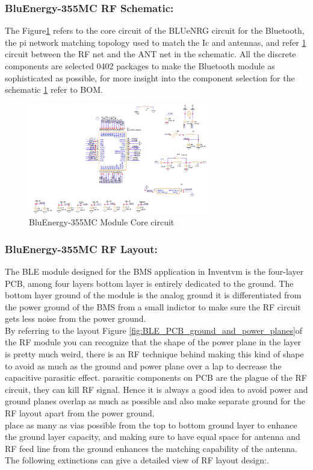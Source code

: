 \subsubsection{BluEnergy-355MC RF Schematic:}
The Figure\ref{fig:STM_BLE_Schematic} refers to the core circuit of the BLUeNRG circuit for the Bluetooth, the pi network matching topology used to match the Ic and antennas, and refer \ref{fig:STM_BLE_Schematic} circuit between the RF net and the ANT net in the schematic.
All the discrete components are selected 0402 packages to make the Bluetooth module as sophisticated as possible, for more insight into the component selection for the schematic \ref{fig:STM_BLE_Schematic} refer to BOM\cite{BLNRG355_STEVAL_BOM}.
\begin{figure}[h]
	\centering
	\includegraphics[width=0.7\textwidth]{Chap03/Figures/STM_BLE_Schematic.PNG}
	\caption{BluEnergy-355MC Module Core circuit }
	\label{fig:STM_BLE_Schematic}
\end{figure}

\subsubsection{BluEnergy-355MC RF Layout:}
The BLE module designed for the BMS application in Inventvm is the four-layer PCB, among four layers bottom layer is entirely dedicated to the ground. The bottom layer ground of the module is the analog ground it is differentiated from the power ground of the BMS from a small indictor to make sure the RF circuit gets less noise from the power ground. \\
\indent By referring to the layout Figure \ref{fig:BLE_PCB_ground_and_power_planes}of the RF module you can recognize that the shape of the power plane in the layer is pretty much weird, there is an RF technique behind making this kind of shape to avoid as much as the ground and power plane over a lap to decrease the capacitive parasitic effect. parasitic components on PCB are the plague of the RF circuit, they can kill RF signal. Hence it is always a good idea to avoid power and ground planes overlap as much as possible and also make separate ground for the RF layout apart from the power ground.\\
\indent place as many as vias possible from the top to bottom ground layer to enhance the ground layer capacity, and making sure to have equal space for antenna and RF feed line from the ground enhances the matching capability of the antenna. The following extinctions can give a detailed view of RF layout design:.

